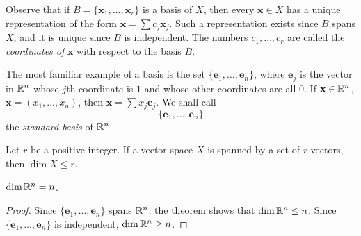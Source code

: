 \begin{mydef}
\begin{asparaenum}[(a)]
        Observe that if $B = \{\mathbf{x}_1, ... , \mathbf{x}_r\}$ is a basis of $X$, then every $\mathbf{x} \in X$ has a unique representation of the form $\mathbf{x} = \sum c_j \mathbf{x}_j$.
        Such a representation exists since $B$ spans $X$,
        and it is unique since $B$ is independent.
        The numbers $c_1, \dots, c_r$ are called the \emph{coordinates of} $\mathbf{x}$ with respect to the basis $B$.

        The most familiar example of a basis is the set $\{\mathbf{e}_1, \dots, \mathbf{e}_n\}$,
        where $\mathbf{e}_j$ is the vector in ${\protect\mathbb R}^n$ whose $j$th coordinate is $1$ and whose other coordinates are all $0$.
        If $\mathbf{x} \in {\protect\mathbb R}^n$, $\mathbf{x} = (x_1, \dots ,x_n)$,
        then $\mathbf{x} = \sum x_j \mathbf{e}_j$.
        We shall call 
        \begin{equation*}
            \{\mathbf{e}_1, \dots , \mathbf{e}_n\}
        \end{equation*}
        the \emph{standard basis} of ${\protect\mathbb R}^n$.
    \end{asparaenum}

\end{mydef}


\begin{thm}
    \label{thm:9.2}
    Let $r$ be a positive integer. 
    If a vector space $X$ is spanned by a set of $r$ vectors, 
    then $\dim X \leq r$.
\end{thm}


\begin{myCorollary*}
    $\dim {\protect\mathbb R}^n = n$.
\end{myCorollary*}

\begin{proof}
    Since $\{\mathbf{e}_1, \dots , \mathbf{e}_n\}$ spans ${\protect\mathbb R}^n$,
    the theorem shows that $\dim {\protect\mathbb R}^n \leq n$.
    Since $\{\mathbf{e}_1, \dots , \mathbf{e}_n\}$ is independent,
    $\dim {\protect\mathbb R}^n \geq n$.
\end{proof}

